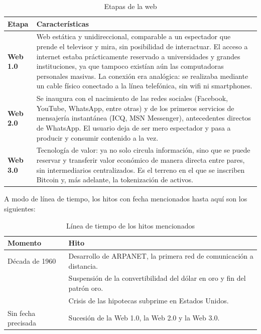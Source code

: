 \documentclass[12pt,oneside]{book}
\begin{document}
\begin{table}[H]
\centering
\caption{Etapas de la web}
\renewcommand{\arraystretch}{1.25}
\small
\begin{tabularx}{\textwidth}{
    >{\raggedright\arraybackslash}p{}
    >{\raggedright\arraybackslash}X
}
\toprule
\textbf{Etapa} & \textbf{Características} \\
\midrule
\textbf{Web 1.0} &
Web estática y unidireccional, comparable a un espectador que prende el televisor y mira, sin posibilidad de interactuar. El acceso a internet estaba prácticamente reservado a universidades y grandes instituciones, ya que tampoco existían aún las computadoras personales masivas. La conexión era analógica: se realizaba mediante un cable físico conectado a la línea telefónica, sin wifi ni smartphones. \\
\midrule[0.3pt]
\textbf{Web 2.0} &
Se inaugura con el nacimiento de las redes sociales (Facebook, YouTube, WhatsApp, entre otras) y de los primeros servicios de mensajería instantánea (ICQ, MSN Messenger), antecedentes directos de WhatsApp. El usuario deja de ser mero espectador y pasa a producir y consumir contenido a la vez. \\
\midrule[0.3pt]
\textbf{Web 3.0} &
Tecnología de valor: ya no solo circula información, sino que se puede reservar y transferir valor económico de manera directa entre pares, sin intermediarios centralizados. Es el terreno en el que se inscriben Bitcoin y, más adelante, la tokenización de activos. \\
\bottomrule
\end{tabularx}
\end{table}

A modo de línea de tiempo, los hitos con fecha mencionados hasta aquí son los siguientes:

\begin{table}[H]
\centering
\caption{Línea de tiempo de los hitos mencionados}
\renewcommand{\arraystretch}{1.25}
\small
\begin{tabularx}{\textwidth}{
    >{\raggedright\arraybackslash}p{}
    >{\raggedright\arraybackslash}X
}
\toprule
\textbf{Momento} & \textbf{Hito} \\
\midrule
Década de 1960 & Desarrollo de ARPANET, la primera red de comunicación a distancia. \\
1971 & Suspensión de la convertibilidad del dólar en oro y fin del patrón oro. \\
2008 & Crisis de las hipotecas subprime en Estados Unidos. \\
Sin fecha precisada & Sucesión de la Web 1.0, la Web 2.0 y la Web 3.0. \\
\bottomrule
\end{tabularx}
\end{table}
\end{document}
